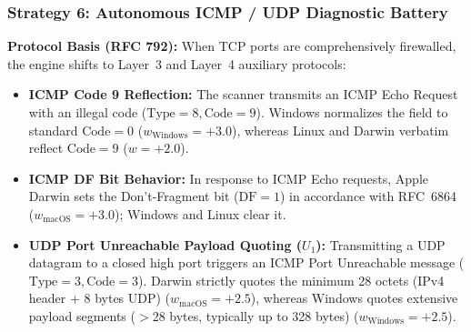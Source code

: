 \subsubsection{Strategy 6: Autonomous ICMP / UDP Diagnostic Battery }
\textbf{Protocol Basis (RFC 792):} When TCP ports are comprehensively firewalled, the engine shifts to Layer~3
and Layer~4 auxiliary protocols:
\begin{itemize}
    \item \textbf{ICMP Code 9 Reflection:} The scanner transmits an ICMP Echo Request with an illegal code
    ($\text{Type} = 8, \text{Code} = 9$). Windows normalizes the field to standard $\text{Code} = 0$
    ($w_{\text{Windows}} = +3.0$), whereas Linux and Darwin verbatim reflect $\text{Code} = 9$ ($w = +2.0$).
    \item \textbf{ICMP DF Bit Behavior:} In response to ICMP Echo requests, Apple Darwin sets the
    Don't-Fragment bit ($\text{DF}=1$) in accordance with RFC~6864 ($w_{\text{macOS}} = +3.0$); Windows and Linux clear it.
    \item \textbf{UDP Port Unreachable Payload Quoting ($U_1$):} Transmitting a UDP datagram to a closed high
    port triggers an ICMP Port Unreachable message ($\text{Type} = 3, \text{Code} = 3$). Darwin strictly quotes
    the minimum 28 octets (IPv4 header + 8 bytes UDP) ($w_{\text{macOS}} = +2.5$), whereas Windows quotes extensive
    payload segments ($> 28$ bytes, typically up to 328 bytes) ($w_{\text{Windows}} = +2.5$).
\end{itemize}

